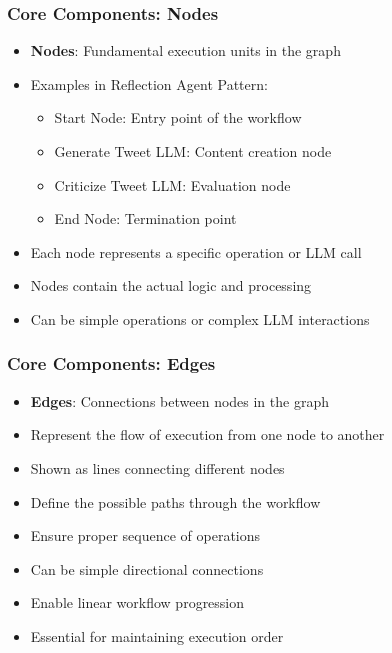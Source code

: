 \begin{frame}[fragile]\frametitle{Core Components: Nodes}
      \begin{itemize}
        \item \textbf{Nodes}: Fundamental execution units in the graph
        \item Examples in Reflection Agent Pattern:
        \begin{itemize}
            \item Start Node: Entry point of the workflow
            \item Generate Tweet LLM: Content creation node
            \item Criticize Tweet LLM: Evaluation node
            \item End Node: Termination point
        \end{itemize}
        \item Each node represents a specific operation or LLM call
        \item Nodes contain the actual logic and processing
        \item Can be simple operations or complex LLM interactions
      \end{itemize}
\end{frame}

\begin{frame}[fragile]\frametitle{Core Components: Edges}
      \begin{itemize}
        \item \textbf{Edges}: Connections between nodes in the graph
        \item Represent the flow of execution from one node to another
        \item Shown as lines connecting different nodes
        \item Define the possible paths through the workflow
        \item Ensure proper sequence of operations
        \item Can be simple directional connections
        \item Enable linear workflow progression
        \item Essential for maintaining execution order
      \end{itemize}
\end{frame}

